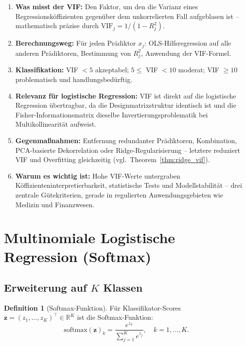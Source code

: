 ﻿\documentclass[12pt, a4paper]{article}
\theoremstyle{definition}
\newtheorem{definition}[theorem]{Definition}
\theoremstyle{remark}
\newcommand{\R}{\mathbb{R}}
\newcommand{\vz}{\bm{z}}
\newcommand{\T}{\top}
\begin{document}
\begin{tcolorbox}[notebox, title={Kernaussagen: VIF und Multikollinearität}]
	\begin{enumerate}[label=\textbf{\arabic*.}]
		\item \textbf{Was misst der VIF:} Den Faktor, um den die Varianz eines Regressionsköffizienten
		gegenüber dem unkorrelierten Fall aufgeblasen ist -- mathematisch präzise durch 
		$\mathrm{VIF}_j = 1/(1-R_j^2)$.
		\item \textbf{Berechnungsweg:} Für jeden Prädiktor $x_j$: OLS-Hilfsregression auf alle
		anderen Prädiktoren, Bestimmung von $R_j^2$, Anwendung der VIF-Formel.
		\item \textbf{Klassifikation:} VIF $< 5$ akzeptabel; $5 \leq$ VIF $< 10$ moderat;
		VIF $\geq 10$ problematisch und handlungsbedürftig.
		\item \textbf{Relevanz für logistische Regression:} VIF ist direkt auf die logistische
		Regression übertragbar, da die Designmatrixstruktur identisch ist und die
		Fisher-Informationsmatrix dieselbe Invertierungsproblematik bei Multikollinearität aufweist.
		\item \textbf{Gegenmaßnahmen:} Entfernung redundanter Prädiktoren, Kombination,
		PCA-basierte Dekorrelation oder Ridge-Regularisierung -- letztere reduziert VIF und
		Overfitting gleichzeitig (vgl.~Theorem~\ref{thm:ridge_vif}).
		\item \textbf{Warum es wichtig ist:} Hohe VIF-Werte untergraben Köffizienteninterpretierbarkeit,
		statistische Tests und Modellstabilität -- drei zentrale Gütekriterien, gerade in
		regulierten Anwendungsgebieten wie Medizin und Finanzwesen.
	\end{enumerate}
\end{tcolorbox}

\section{Multinomiale Logistische Regression (Softmax)}

\subsection{Erweiterung auf $K$ Klassen}

\begin{definition}[Softmax-Funktion]
  Für Klassifikator-Scores $\vz = (z_1,\ldots,z_K)^\T \in \R^K$ ist die Softmax-Funktion:
  \begin{equation}
    \mathrm{softmax}(\vz)_k = \frac{e^{z_k}}{\sum_{j=1}^K e^{z_j}}, \quad k = 1, \ldots, K.
    \label{eq:softmax}
  \end{equation}
\end{definition}
\end{document}
